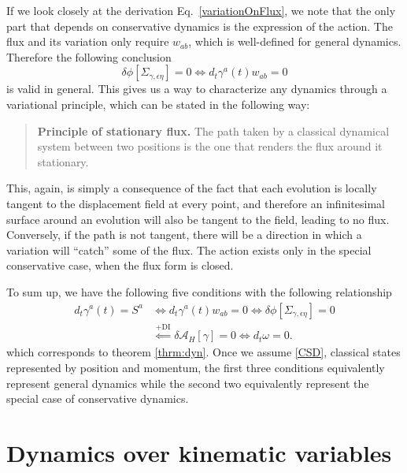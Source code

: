 \documentclass[nofootinbib,aps,pre]{revtex4-2}
\begin{document}
If we look closely at the derivation Eq.~\eqref{variationOnFlux}, we note that the only part that depends on conservative dynamics is the expression of the action. The flux and its variation only require $w_{ab}$, which is well-defined for general dynamics. Therefore the following conclusion
\begin{equation}
	\delta \phi[\Sigma_{\gamma, \epsilon \eta}]=0 \iff d_t \gamma^a(t) w_{ab} = 0
\end{equation}
is valid in general. This gives us a way to characterize any dynamics through a variational principle, which can be stated in the following way:
\begin{quote}
	\textbf{Principle of stationary flux.} The path taken by a classical dynamical system between two positions is the one that renders the flux around it stationary.
\end{quote}
This, again, is simply a consequence of the fact that each evolution is locally tangent to the displacement field at every point, and therefore an infinitesimal surface around an evolution will also be tangent to the field, leading to no flux. Conversely, if the path is not tangent, there will be a direction in which a variation will ``catch'' some of the flux. The action exists only in the special conservative case, when the flux form is closed.

To sum up, we have the following five conditions with the following relationship
\begin{equation}
\begin{aligned}
    d_t \gamma^a(t) = S^a &\iff d_t \gamma^a(t) w_{ab}=0 \iff \delta \phi[\Sigma_{\gamma, \epsilon \eta}]=0 \\&\stackrel{\text{+DI}}{\impliedby} \delta \mathcal{A}_H[\gamma] = 0 \iff d_t \omega =0.
\end{aligned}
\end{equation}
which corresponds to theorem \ref{thrm:dyn}. Once we assume \ref{CSD}, classical states represented by position and momentum, the first three conditions equivalently represent general dynamics while the second two equivalently represent the special case of conservative dynamics.

\section{Dynamics over kinematic variables}
\label{sec:kinematicvar}
\end{document}
